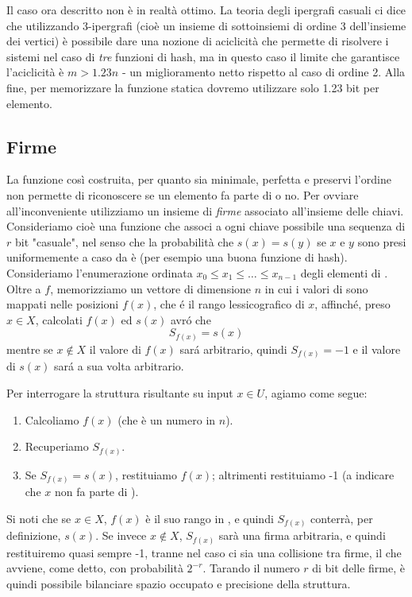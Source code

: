 Il caso ora descritto non è in realtà ottimo. La teoria degli ipergrafi casuali ci dice che utilizzando 3-ipergrafi (cioè un insieme di sottoinsiemi di ordine 3 dell'insieme dei vertici) è possibile dare una nozione di aciclicità che permette di risolvere i sistemi nel caso di \textit{tre} funzioni di hash, ma in questo caso il limite che garantisce l'aciclicità è $m > 1.23n$ - un miglioramento netto rispetto al caso di ordine 2.
Alla fine, per memorizzare la funzione statica  dovremo utilizzare solo 1.23 bit per elemento.
\subsection{Firme}
La funzione così costruita, per quanto sia minimale, perfetta e preservi l'ordine non permette di riconoscere se un elemento fa parte di  o no. Per ovviare all'inconveniente utilizziamo un insieme di \textit{firme} associato all'insieme  delle chiavi. Consideriamo cioè una funzione  che associ a ogni chiave possibile una sequenza di $r$ bit "casuale", nel senso che la probabilità che $s(x) = s(y)$ se $x$ e $y$ sono presi uniformemente a caso da  è  (per esempio una buona funzione di hash). Consideriamo l'enumerazione ordinata $x_0 \leq x_1 \leq \dots \leq x_{n - 1}$ degli elementi di . Oltre a $f$, memorizziamo 
un vettore di dimensione $n$ in cui i valori di  sono mappati nelle posizioni $f(x)$, che é il rango lessicografico di $x$, affinché, preso $x \in X$, calcolati $f(x)$ ed $s(x)$ avró che
\begin{equation*}
    S_{f(x)} = s(x)
\end{equation*}
mentre se $x \notin X$ il valore di $f(x)$ sará arbitrario, quindi $S_{f(x)} = -1$ e il valore di $s(x)$ sará a sua volta arbitrario.

Per interrogare la struttura risultante su input $x \in U$, agiamo come segue:
\begin{enumerate}
    \item Calcoliamo $f(x)$ (che è un numero in $n$).
    \item Recuperiamo $S_{f(x)}$.
    \item Se $S_{f(x)} = s(x)$, restituiamo $f(x)$; altrimenti restituiamo -1 (a indicare che $x$ non fa parte di ).
\end{enumerate}
Si noti che se $x \in X$, $f(x)$ è il suo rango in , e quindi $S_{f(x)}$ conterrà, per definizione, $s(x)$.
Se invece $x \notin X$, $S_{f(x)}$ sarà una firma arbitraria, e quindi restituiremo quasi sempre -1, tranne nel caso ci sia una collisione tra firme, il che avviene, come detto, con probabilità $2^{-r}$. Tarando il numero $r$ di bit delle firme, è quindi possibile bilanciare spazio occupato e precisione della struttura.

